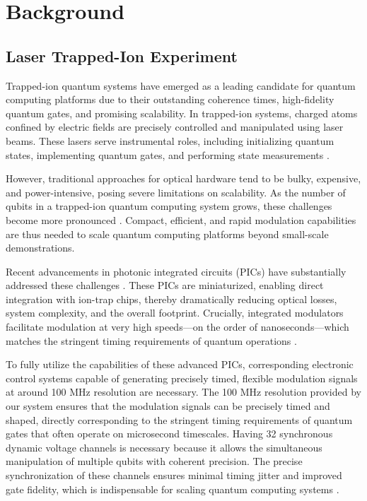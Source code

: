 \chapter{Background}

\section{Laser Trapped-Ion Experiment}

Trapped-ion quantum systems have emerged as a leading candidate for quantum computing platforms due to their outstanding coherence times, high-fidelity quantum gates, and promising scalability. In trapped-ion systems, charged atoms confined by electric fields are precisely controlled and manipulated using laser beams. These lasers serve instrumental roles, including initializing quantum states, implementing quantum gates, and performing state measurements \cite{naturequantuminfo}. 

However, traditional approaches for optical hardware tend to be bulky, expensive, and power-intensive, posing severe limitations on scalability. As the number of qubits in a trapped-ion quantum computing system grows, these challenges become more pronounced \cite{photonicreview}. Compact, efficient, and rapid modulation capabilities are thus needed to scale quantum computing platforms beyond small-scale demonstrations.

Recent advancements in photonic integrated circuits (PICs) have substantially addressed these challenges \cite{apic}. These PICs are miniaturized, enabling direct integration with ion-trap chips, thereby dramatically reducing optical losses, system complexity, and the overall footprint. Crucially, integrated modulators facilitate modulation at very high speeds—on the order of nanoseconds—which matches the stringent timing requirements of quantum operations \cite{naturequantuminfo}.

To fully utilize the capabilities of these advanced PICs, corresponding electronic control systems capable of generating precisely timed, flexible modulation signals at around 100 MHz resolution are necessary. The 100 MHz resolution provided by our system ensures that the modulation signals can be precisely timed and shaped, directly corresponding to the stringent timing requirements of quantum gates that often operate on microsecond timescales. Having 32 synchronous dynamic voltage channels is necessary because it allows the simultaneous manipulation of multiple qubits with coherent precision. The precise synchronization of these channels ensures minimal timing jitter and improved gate fidelity, which is indispensable for scaling quantum computing systems \cite{manychanfpgactrlsys}.

